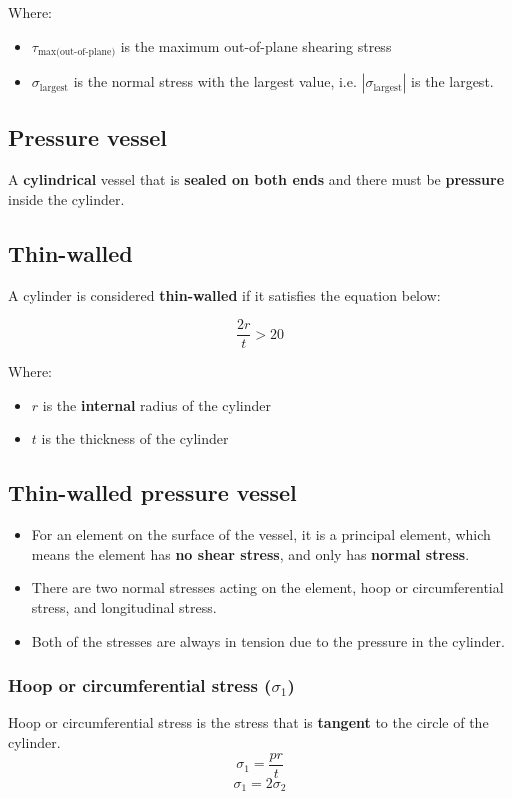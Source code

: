 \documentclass[11pt]{article}
\begin{document}
Where:
\begin{itemize}
\item \(\tau_{\text{max(out-of-plane)}}\) is the maximum out-of-plane shearing stress
\item \(\sigma_{\text{largest}}\) is the normal stress with the largest value, i.e. \(|\sigma_{\text{largest}}|\) is the largest.
\end{itemize}

\subsection{Pressure vessel}
\label{sec:org66d5917}
A \textbf{cylindrical} vessel that is \textbf{sealed on both ends} and there must be \textbf{pressure} inside the cylinder.

\subsection{Thin-walled}
\label{sec:org3315264}
A cylinder is considered \textbf{thin-walled} if it satisfies the equation below:

\[\frac{2r}{t} > 20\]

Where:
\begin{itemize}
\item \(r\) is the \textbf{internal} radius of the cylinder
\item \(t\) is the thickness of the cylinder
\end{itemize}

\subsection{Thin-walled pressure vessel}
\label{sec:org71b2ebf}
\begin{itemize}
\item For an element on the surface of the vessel, it is a principal element, which means the element has \textbf{no shear stress}, and only has \textbf{normal stress}.
\item There are two normal stresses acting on the element, hoop or circumferential stress, and longitudinal stress.
\item Both of the stresses are always in tension due to the pressure in the cylinder.
\end{itemize}

\subsubsection{Hoop or circumferential stress (\(\sigma_1\))}
\label{sec:org9181660}
Hoop or circumferential stress is the stress that is \textbf{tangent} to the circle of the cylinder.
\[\sigma_1 = \frac{pr}{t}\]
\[\sigma_1 = 2 \sigma_2\]
\end{document}
